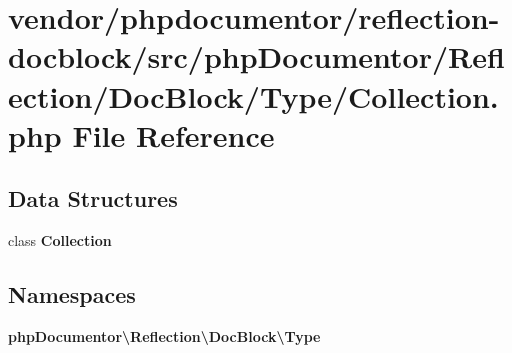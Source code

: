 \section{vendor/phpdocumentor/reflection-\/docblock/src/php\+Documentor/\+Reflection/\+Doc\+Block/\+Type/\+Collection.php File Reference}
\label{phpdocumentor_2reflection-docblock_2src_2php_documentor_2_reflection_2_doc_block_2_type_2_collection_8php}
\subsection*{Data Structures}
\begin{DoxyCompactItemize}
\item 
class {\bf Collection}
\end{DoxyCompactItemize}
\subsection*{Namespaces}
\begin{DoxyCompactItemize}
\item 
 {\bf php\+Documentor\textbackslash{}\+Reflection\textbackslash{}\+Doc\+Block\textbackslash{}\+Type}
\end{DoxyCompactItemize}
